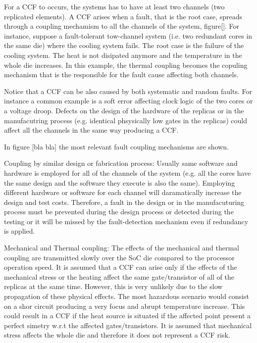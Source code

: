 For a CCF to occurs, the systems has to have at least two channels (two replicated elements). A CCF arises when a fault, that is the root case, spreads through a coupling mechamism to all the channels of the system, figure[]. For instance, suppose a fault-tolerant tow-channel system (i.e. two redundant cores in the same die) where the cooling system fails. The root case is the failure of the cooling system. The heat is not disipated anymore and the temperature in the whole die increases. In this example, the thermal coupling becomes the copuling mechanism that is the responsible for the fault cause affecting both channels.

Notice that a CCF can be also caused by both systematic and random faults. For instance a common example is a soft error affecting clock logic of the two cores or a voltage droop. Defects on the design of the hardware of the replicas or in the manufacutring process (e.g. identical phsysically low gates in the replicas) could affect all the channels in the same way producing a CCF.

In figure [bla bla] the most relevant fault coupling mechanisms are shown. 


Coupling by similar design or fabrication process: Usually same software and hardware is employed for all of the channels of the system (e.g. all the cores have the same design and the software they execute is also the same). Employing different hardware or software for each channel will daramatically increase the design and test costs. Therefore, a fault in the design or in the manufacuturing process must be prevented during the design process or detected during the testing or it will be missed by the fault-detection mechanism even if redundancy is applied. 

Mechanical and Thermal coupling: The effects of the mechanical and thermal coupling are transmitted slowly over the SoC die compared to the processor operation speed. It is assumed that a CCF can arise only if the effects of the mechanical stress or the heating affect the same gate/transistor of all of the replicas at the same time. However, this is very unlikely due to the slow propagation of these physical effects. The most hazardous scenario would consist on a shor circuit producing a very focus and abrupt temperature increase. This could result in a CCF if the heat source is situated if the affected point present a perfect simetry w.r.t the affected gates/transistors. It is assumed that mechanical stress affects the whole die and therefore it does not represent a CCF risk. 


